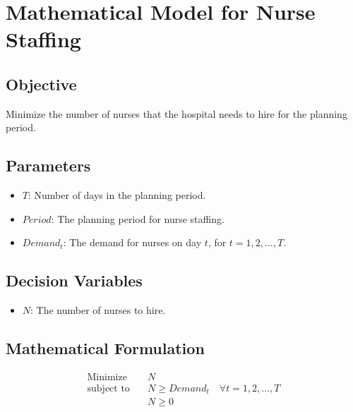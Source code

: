 \documentclass{article}
\begin{document}
\section*{Mathematical Model for Nurse Staffing}

\subsection*{Objective}
Minimize the number of nurses that the hospital needs to hire for the planning period.

\subsection*{Parameters}
\begin{itemize}
    \item $T$: Number of days in the planning period.
    \item $Period$: The planning period for nurse staffing.
    \item $Demand_t$: The demand for nurses on day $t$, for $t = 1, 2, \ldots, T$.
\end{itemize}

\subsection*{Decision Variables}
\begin{itemize}
    \item $N$: The number of nurses to hire.
\end{itemize}

\subsection*{Mathematical Formulation}
\begin{align*}
    \text{Minimize} \quad & N \\
    \text{subject to} \quad & N \geq Demand_t \quad \forall t = 1, 2, \ldots, T \\
    & N \geq 0
\end{align*}
\end{document}
